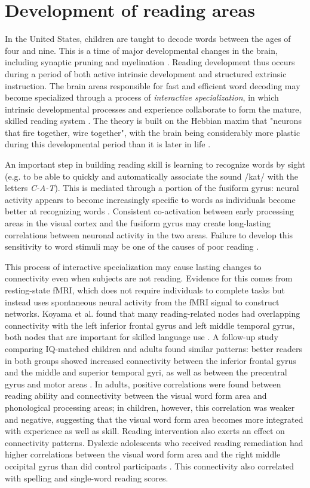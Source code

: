 \section{Development of reading areas}

In the United States, children are taught to decode words between the ages of four and nine. This is a time of major developmental changes in the brain, including synaptic pruning and myelination \cite{Wandell2013}. Reading development thus occurs during a period of both active intrinsic development and structured extrinsic instruction. The brain areas responsible for fast and efficient word decoding may become specialized through a process of \textit{interactive specialization}, in which intrinsic developmental processes and experience collaborate to form the mature, skilled reading system \cite{Johnson2011, Klingberg2014}. The theory is built on the Hebbian maxim that "neurons that fire together, wire together", with the brain being considerably more plastic during this developmental period than it is later in life \cite{Hebb1949}.

An important step in building reading skill is learning to recognize words by sight (e.g. to be able to quickly and automatically associate the sound /kat/ with the letters \textit{C-A-T}). This is mediated through a portion of the fusiform gyrus: neural activity appears to become increasingly specific to words as individuals become better at recognizing words \cite{Mccandliss2003, Schlaggar2007}. Consistent co-activation between early processing areas in the visual cortex and the fusiform gyrus may create long-lasting correlations between neuronal activity in the two areas. Failure to develop this sensitivity to word stimuli may be one of the causes of poor reading \cite{He2013}.  

This process of interactive specialization may cause lasting changes to connectivity even when subjects are not reading. Evidence for this comes from resting-state fMRI, which does not require individuals to complete tasks but instead uses spontaneous neural activity from the fMRI signal to construct networks. Koyama et al. found that many reading-related nodes had overlapping connectivity with the left inferior frontal gyrus and left middle temporal gyrus, both nodes that are important for skilled language use \cite{Koyama2010}. A follow-up study comparing IQ-matched children and adults found similar patterns: better readers in both groups showed increased connectivity between the inferior frontal gyrus and the middle and superior temporal gyri, as well as between the precentral gyrus and motor areas \cite{Koyama2011}. In adults, positive correlations were found between reading ability and connectivity between the visual word form area and phonological processing areas; in children, however, this correlation was weaker and negative, suggesting that the visual word form area becomes more integrated with experience as well as skill. Reading intervention also exerts an effect on connectivity patterns. Dyslexic adolescents who received reading remediation had higher correlations between the visual word form area and the right middle occipital gyrus than did control participants \cite{Koyama2013}. This connectivity also correlated with spelling and single-word reading scores.

